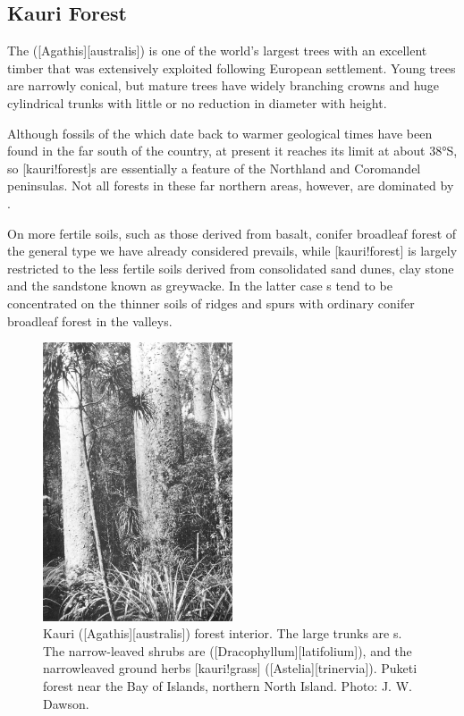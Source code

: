 \subsection{Kauri Forest}

The  ([Agathis][australis]) is one of the world's largest trees with an excellent timber that was extensively exploited following European settlement.
Young trees are narrowly conical, but mature trees have widely branching crowns and huge cylindrical trunks with little or no reduction in diameter with height.

Although fossils of the  which date back to warmer geological times have been found in the far south of the country, at present it reaches its limit at about \ang{38}S, so [kauri!forest]s are essentially a feature of the Northland and Coromandel peninsulas.
Not all forests in these far northern areas, however, are dominated by .

On more fertile soils, such as those derived from basalt, conifer broadleaf forest of the general type we have already considered prevails, while [kauri!forest] is largely restricted to the less fertile soils derived from consolidated sand dunes, clay stone and the sandstone known as greywacke.
In the latter case s tend to be concentrated on the thinner soils of ridges and spurs with ordinary conifer broadleaf forest in the valleys.

\begin{figure}
	\includegraphics[width=0.5\textwidth]{graphics/figure65kauri.jpg}
	\centering
	\caption[Kauri forest interior]{Kauri ([Agathis][australis]) forest interior.
	The large trunks are s.
	The narrow-leaved shrubs are  ([Dracophyllum][latifolium]), and the narrowleaved ground herbs [kauri!grass] ([Astelia][trinervia]).
	Puketi forest near the Bay of Islands, northern North Island.
	Photo:  J. W. Dawson.}%
	\label{fig:65kauri}
\end{figure}

